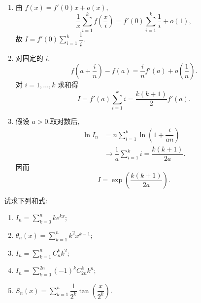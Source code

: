 \begin{solution}
    \begin{enumerate}
        \item 由 $f(x)=f'(0)x+o(x)$,
              \[
                  \dfrac{1}{x}\sum\limits_{i=1}^{k}f\left(\dfrac{x}{i}\right)
                  =f'(0)\sum\limits_{i=1}^{k}\dfrac{1}{i}+o(1),
              \]
              故 $I=f'(0)\displaystyle\sum\limits_{i=1}^{k}\dfrac{1}{i}$.
        \item 对固定的 $i$,
              \[
                  f\left(a+\dfrac{i}{n}\right)-f(a)
                  =\dfrac{i}{n}f'(a)+o\left(\dfrac{1}{n}\right).
              \]
              对 $i=1,\ldots,k$ 求和得
              \[
                  I=f'(a)\sum\limits_{i=1}^{k}i
                  =\dfrac{k(k+1)}{2}f'(a).
              \]
        \item 假设 $a>0$.取对数后,
              \[
                  \begin{aligned}
                      \ln I_n
                       & =n\sum\limits_{i=1}^{k}
                      \ln\left(1+\dfrac{i}{an}\right)                      \\
                       & \longrightarrow\dfrac{1}{a}\sum\limits_{i=1}^{k}i
                      =\dfrac{k(k+1)}{2a}.
                  \end{aligned}
              \]
              因而
              \[
                  I=\exp\left(\dfrac{k(k+1)}{2a}\right).
              \]
    \end{enumerate}
\end{solution}

\begin{example}
    试求下列和式:
    \begin{enumerate}
        \item $\displaystyle I_n=\sum\limits_{k=0}^n ke^{kx}$;
        \item $\displaystyle \theta_n(x)=\sum\limits_{k=1}^n k^2x^{k-1}$;
        \item $\displaystyle I_n=\sum\limits_{k=1}^n C_{n}^{k}k^2$;
        \item $\displaystyle I_n=\sum\limits_{k=0}^{2n}(-1)^k C_{2n}^{k}k^n$;
        \item $\displaystyle S_n(x)=\sum\limits_{k=1}^n\dfrac{1}{2^k}\tan\left(\dfrac{x}{2^k}\right)$.
    \end{enumerate}
\end{example}
\exampleblank

